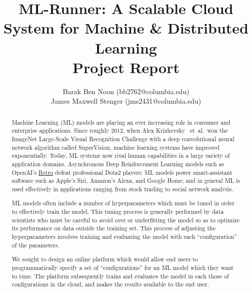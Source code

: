\documentclass[12pt,oneside]{amsart}
\title{ML-Runner: A Scalable Cloud System for Machine \& Distributed Learning \\ {\smaller \textbf{Project Report \YellowPaperVersionNumber}}}
\author{
    Barak Ben Noon (bb2762@columbia.edu) \\
    James Maxwell Stenger (jms2431@columbia.edu)
}
\newcommand{\etal}{\mbox{ et al. }}
\begin{document}
\pagecolor{pagecolor}

\begin{abstract}
Machine Learning (ML) models are playing an ever increasing role in consumer and enterprise applications.
Since roughly 2012, when Alex Krizhevsky \etal won the ImageNet Large-Scale Visual Recognition Challenge with a deep convolutional neural network algorithm called SuperVision,
machine learning systems have improved exponentially.
Today, ML systems now rival human capabilities in a large variety of application domains.
Asynchronous Deep Reinforcement Learning models such as OpenAI's \href{https://github.com/openai/retro}{Retro} defeat professional Dota2 players;
ML models power smart-assistant software such as Apple's Siri, Amazon's Alexa, and Google Home;
and in general ML is used effectively in applications ranging from stock trading to social network analysis.

ML models often include a number of hyperparameters which must be tuned in order to effectively train the model.
This tuning process is generally performed by data scientists who must be careful to avoid over or underfitting the model so as to optimize its performance on data outside the training set.
This process of adjusting the hyperparameters involves training and evaluating the model with each ``configuration'' of the parameters.

We sought to design an online platform which would allow end users to programmatically specify a set of ``configurations'' for an ML model which they want to tune.
The platform subsequently trains and evaluates the model in each those of configurations in the cloud, and makes the results available to the end user.
\end{abstract}
\end{document}
